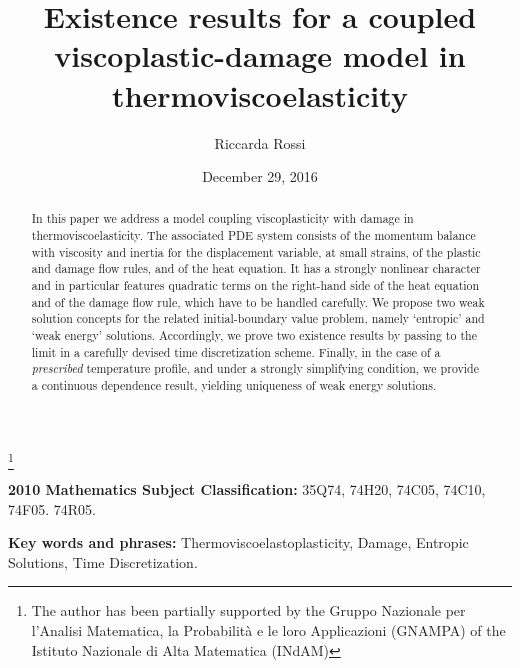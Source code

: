 \documentclass[a4paper,10pt,reqno]{amsart}
\numberwithin{equation}{section}
\numberwithin{equation}{section}
\newcommand{\EEE}{\color{black}}
\newcommand{\MMM}{\color{black}}%
\begin{document}
\title[A coupled viscoplastic-damage system with temperature]{Existence results for a coupled viscoplastic-damage model in thermoviscoelasticity}



\author{Riccarda Rossi}
%
\address{R.\ Rossi, DIMI, Universit\`a degli studi di Brescia,
via Branze 38, 25133 Brescia - Italy}



\thanks{The author has been partially supported by the  Gruppo Nazionale per  l'Analisi Matematica, la
  Probabilit\`a  e le loro Applicazioni (GNAMPA)
of the Istituto Nazionale di Alta Matematica (INdAM)}

\date{December 29, 2016} 
\begin{abstract}
In this paper we address  a model coupling viscoplasticity  with damage  in thermoviscoelasticity.
The associated PDE system 
consists of the momentum balance with viscosity and inertia for the displacement variable, at small strains, of the plastic and damage flow rules,
and of the heat equation. It 
has a strongly nonlinear character and in particular features quadratic terms on the right-hand side of
the heat equation and of the damage flow rule, which have to be handled carefully. We propose two weak solution concepts for the related initial-boundary value problem, namely `entropic' and `weak energy' solutions.
Accordingly, we prove two existence results
 by passing to the limit in a carefully devised time discretization scheme. Finally, \MMM in the case of   a \emph{prescribed} temperature profile, \EEE and under a strongly simplifying condition, we provide a continuous   dependence result, yielding uniqueness of weak energy solutions. 
\end{abstract}
\maketitle

\noindent
\textbf{2010 Mathematics Subject Classification:}  
35Q74, %
74H20, %
74C05, %
74C10, %
74F05. %
74R05. %
\par
\noindent
\textbf{Key words and phrases:} 
Thermoviscoelastoplasticity, Damage,  Entropic Solutions, Time Discretization.
\medskip
\end{document}
